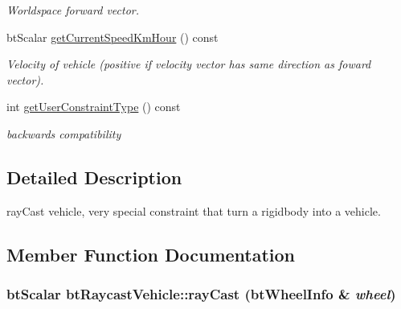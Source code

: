 \begin{CompactItemize}
\begin{CompactList}\small\item\em Worldspace forward vector. \item\end{CompactList}\item 
\hypertarget{classbt_raycast_vehicle_8db5fe1a6b3b36f144cc7a14f59e1c1e}{
btScalar \hyperlink{classbt_raycast_vehicle_8db5fe1a6b3b36f144cc7a14f59e1c1e}{getCurrentSpeedKmHour} () const }
\label{classbt_raycast_vehicle_8db5fe1a6b3b36f144cc7a14f59e1c1e}

\begin{CompactList}\small\item\em Velocity of vehicle (positive if velocity vector has same direction as foward vector). \item\end{CompactList}\item 
\hypertarget{classbt_raycast_vehicle_6e6ae8ff0a356616fc73f5a558d9b1c1}{
int \hyperlink{classbt_raycast_vehicle_6e6ae8ff0a356616fc73f5a558d9b1c1}{getUserConstraintType} () const }
\label{classbt_raycast_vehicle_6e6ae8ff0a356616fc73f5a558d9b1c1}

\begin{CompactList}\small\item\em backwards compatibility \item\end{CompactList}\end{CompactItemize}


\subsection{Detailed Description}
rayCast vehicle, very special constraint that turn a rigidbody into a vehicle. 

\subsection{Member Function Documentation}
\hypertarget{classbt_raycast_vehicle_53451c4e3495561f3f078b2041ef04be}{
\subsubsection[rayCast]{\setlength{\rightskip}{0pt plus 5cm}btScalar btRaycastVehicle::rayCast ({\bf btWheelInfo} \& {\em wheel})}}
\label{classbt_raycast_vehicle_53451c4e3495561f3f078b2041ef04be}




